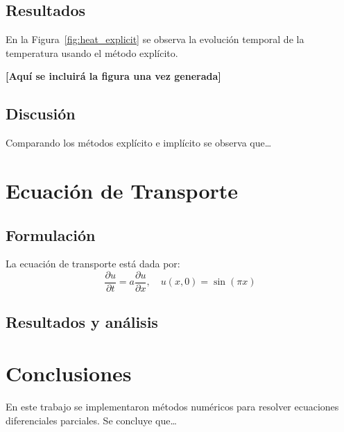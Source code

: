 \documentclass[12pt,a4paper]{article}
\begin{document}
\subsection{Resultados}
En la Figura~\ref{fig:heat_explicit} se observa la evolución temporal de la temperatura usando el método explícito.


\textbf{[Aquí se incluirá la figura una vez generada]}

\subsection{Discusión}
Comparando los métodos explícito e implícito se observa que\ldots

\section{Ecuación de Transporte}
\subsection{Formulación}
La ecuación de transporte está dada por:
\begin{equation}
    \frac{\partial u}{\partial t} = a \frac{\partial u}{\partial x}, \quad
    u(x,0) = \sin(\pi x)
\end{equation}

\subsection{Resultados y análisis}

\section{Conclusiones}
En este trabajo se implementaron métodos numéricos para resolver ecuaciones diferenciales parciales. 
Se concluye que\ldots
\end{document}
